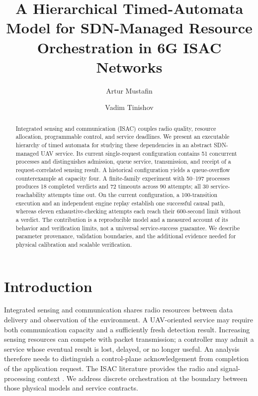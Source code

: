 \documentclass[runningheads]{llncs}
\begin{document}
\title{A Hierarchical Timed-Automata Model for SDN-Managed Resource Orchestration in 6G ISAC Networks}
\author{Artur Mustafin \and
Vadim Tinishov}
\maketitle
\begin{abstract}
Integrated sensing and communication (ISAC) couples radio quality, resource allocation, programmable control, and service deadlines. We present an executable hierarchy of timed automata for studying these dependencies in an abstract SDN-managed UAV service. Its current single-request configuration contains 51 concurrent processes and distinguishes admission, queue service, transmission, and receipt of a request-correlated sensing result. A historical configuration yields a queue-overflow counterexample at capacity four. A finite-family experiment with 50--197 processes produces 18 completed verdicts and 72 timeouts across 90 attempts; all 30 service-reachability attempts time out. On the current configuration, a 100-transition execution and an independent engine replay establish one successful causal path, whereas eleven exhaustive-checking attempts each reach their 600-second limit without a verdict. The contribution is a reproducible model and a measured account of its behavior and verification limits, not a universal service-success guarantee. We describe parameter provenance, validation boundaries, and the additional evidence needed for physical calibration and scalable verification.
\end{abstract}

\section{Introduction}\label{sec:introduction}
Integrated sensing and communication shares radio resources between data delivery and observation of the environment. A UAV-oriented service may require both communication capacity and a sufficiently fresh detection result. Increasing sensing resources can compete with packet transmission; a controller may admit a service whose eventual result is lost, delayed, or no longer useful. An analysis therefore needs to distinguish a control-plane acknowledgement from completion of the application request. The ISAC literature provides the radio and signal-processing context \cite{isac_survey_2022}. We address discrete orchestration at the boundary between those physical models and service contracts.
\end{document}
